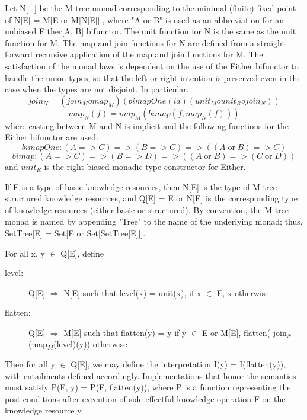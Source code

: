 \documentclass[runningheads]{llncs}
\begin{document}
Let N[\_] be the M-tree monad corresponding to the minimal (finite) fixed point of N[E] = M[E or M[N[E]]], where "A or B" is used as an abbreviation for an unbiased Either[A, B] bifunctor.
The unit function for N is the same as the unit function for M.
The map and join functions for N are defined from a straight-forward recursive application of the map and join functions for M.
The satisfaction of the monad laws is dependent on the use of the Either bifunctor to handle the union types, so that the left or right intention is preserved even in the case when the types are not disjoint. In particular,
$$join_N = (join_M o map_M)( bimapOne( id) (unit_M o unit_R o join_N) ) $$
$$ map_N(f) = map_M( bimap(f, map_N(f)) ) $$
 where casting between M and N is implicit and the following functions for the Either bifunctor are used:
 $$bimapOne: (A=>C) => (B=>C) => ((A \mathop{\mathrm{or}} B)=> C)$$
 $$  bimap   : (A=>C) => (B=>D) => ((A \mathop{\mathrm{or}} B)=> (C \mathop{\mathrm{or}} D))$$
 and $unit_R$ is the right-biased monadic type constructor for Either.

If E is a type of basic knowledge resources, then N[E] is the type of M-tree-structured knowledge resources, and
Q[E] = E or N[E] is the corresponding type of knowledge resources (either basic or structured). By convention, the M-tree monad is named by appending "Tree" to the name of the underlying monad; thus, SetTree[E] = Set[E or Set[SetTree[E]]].

For all x, y $\in$ Q[E], define
\begin{description}
\item[level:] Q[E] $\Rightarrow$ N[E]
such that level(x) = unit(x), if x $\in$ E, x otherwise
\item[flatten:] Q[E] $\Rightarrow$ M[E]  
such that flatten(y) = y if y $\in$  E or M[E], flatten( join$_N$(map$_M$(level)(y)) otherwise
\end{description}
Then for all y $\in$ Q[E], we may define the interpretation I(y) = I(flatten(y)), with entailments defined accordingly. %
Implementations that honor the semantics must satisfy P(F, y) = P(F, flatten(y)), where P is a function representing the post-conditions after execution of side-effectful knowledge operation F on the knowledge resource y.
\end{document}
